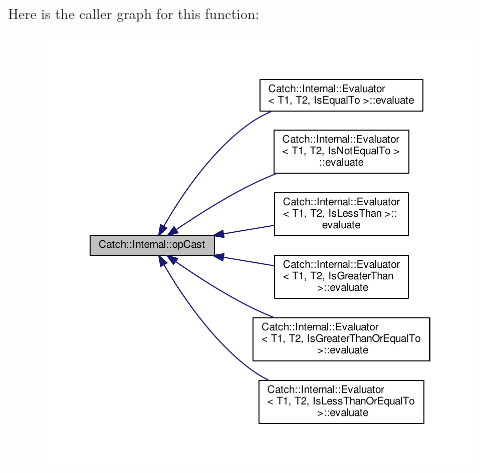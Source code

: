 Here is the caller graph for this function\-:
\nopagebreak
\begin{figure}[H]
\begin{center}
\leavevmode
\includegraphics[width=350pt]{namespace_catch_1_1_internal_adde98c1a650e94615e2b37ab0b3734e2_icgraph}
\end{center}
\end{figure}


